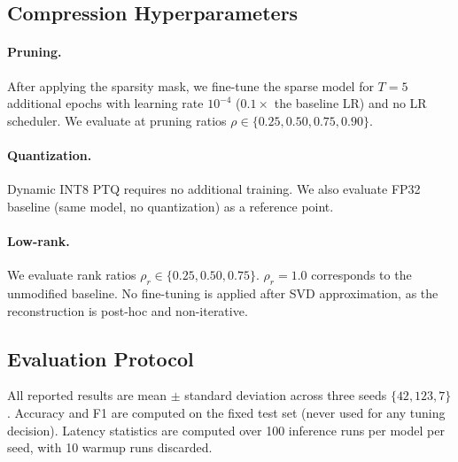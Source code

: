 \subsection{Compression Hyperparameters}

\paragraph{Pruning.}
After applying the sparsity mask, we fine-tune the sparse model for
$T=5$ additional epochs with learning rate $10^{-4}$
($0.1\times$ the baseline LR) and no LR scheduler.
We evaluate at pruning ratios $\rho \in \{0.25, 0.50, 0.75, 0.90\}$.

\paragraph{Quantization.}
Dynamic INT8 PTQ requires no additional training.
We also evaluate FP32 baseline (same model, no quantization) as a
reference point.

\paragraph{Low-rank.}
We evaluate rank ratios $\rho_r \in \{0.25, 0.50, 0.75\}$.
$\rho_r = 1.0$ corresponds to the unmodified baseline.
No fine-tuning is applied after SVD approximation, as the
reconstruction is post-hoc and non-iterative.

\subsection{Evaluation Protocol}

All reported results are mean $\pm$ standard deviation across
three seeds $\{42, 123, 7\}$.
Accuracy and F1 are computed on the fixed test set (never used for
any tuning decision).
Latency statistics are computed over 100 inference runs per model
per seed, with 10 warmup runs discarded.
